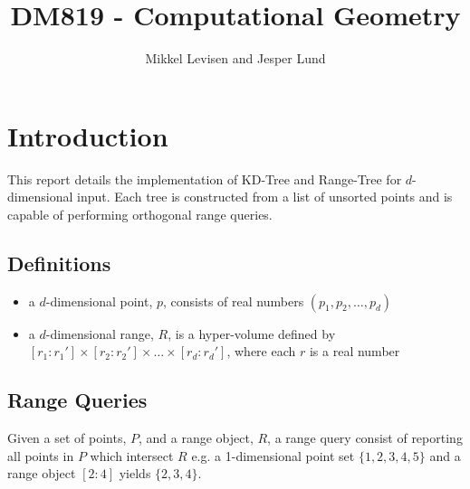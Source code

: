 \documentclass{article}
\newcommand{\subtitle}[1]{%
  \posttitle{%
    \par\end{center}
    \begin{center}\large#1\end{center}
    \vskip0.5em}%
}
\begin{document}
\title{DM819 - Computational Geometry}
\subtitle{Fall 2015\\Project 2}
\author{Mikkel Levisen and Jesper Lund}
\maketitle
\thispagestyle{empty}
\newpage
\tableofcontents
\thispagestyle{empty}
\newpage
\section{Introduction}
  This report details the implementation of KD-Tree and Range-Tree for 
  $d$-dimensional input. Each tree is constructed from a list of unsorted points
  and is capable of performing orthogonal range queries.
  \subsection{Definitions}
  \begin{itemize}
  	\item a $d$-dimensional point, $p$, consists of real numbers $(p_1,p_2,\dots,p_d)$
  	\item a $d$-dimensional range, $R$, is a hyper-volume defined by $[r_1:r_1']
  	\times[r_2:r_2']\times \dots \times [r_d:r_d']$, where each $r$ is a real number
  \end{itemize}

  \subsection{Range Queries}
  Given a set of points, $P$, and a range object, $R$, a range query consist of
  reporting all points in $P$ which intersect $R$ e.g. a 1-dimensional point
  set $\{1,2,3,4,5\}$ and a range object $[2:4]$ yields $\{2,3,4\}$. 
  
  
  
\end{document}
